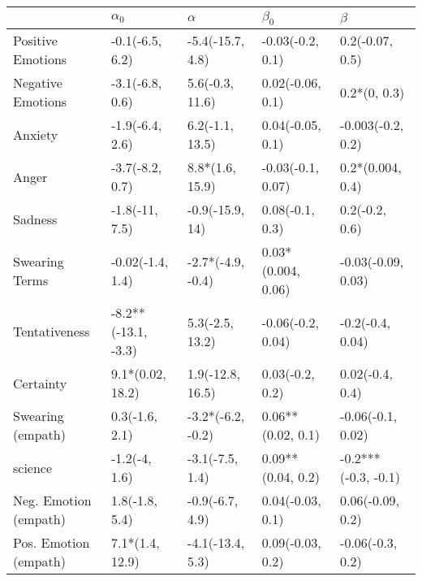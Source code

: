 \begin{tabular}{lllll}
\toprule
{} &           $\alpha_0$ &           $\alpha$ &           $\beta_0$ &              $\beta$ \\
\midrule
Positive Emotions     &      -0.1(-6.5, 6.2) &   -5.4(-15.7, 4.8) &    -0.03(-0.2, 0.1) &      0.2(-0.07, 0.5) \\
Negative Emotions     &      -3.1(-6.8, 0.6) &    5.6(-0.3, 11.6) &    0.02(-0.06, 0.1) &         0.2*(0, 0.3) \\
Anxiety               &      -1.9(-6.4, 2.6) &    6.2(-1.1, 13.5) &    0.04(-0.05, 0.1) &    -0.003(-0.2, 0.2) \\
Anger                 &      -3.7(-8.2, 0.7) &    8.8*(1.6, 15.9) &   -0.03(-0.1, 0.07) &     0.2*(0.004, 0.4) \\
Sadness               &       -1.8(-11, 7.5) &    -0.9(-15.9, 14) &     0.08(-0.1, 0.3) &       0.2(-0.2, 0.6) \\
Swearing Terms        &     -0.02(-1.4, 1.4) &  -2.7*(-4.9, -0.4) &  0.03*(0.004, 0.06) &   -0.03(-0.09, 0.03) \\
Tentativeness         &  -8.2**(-13.1, -3.3) &    5.3(-2.5, 13.2) &   -0.06(-0.2, 0.04) &     -0.2(-0.4, 0.04) \\
Certainty             &     9.1*(0.02, 18.2) &   1.9(-12.8, 16.5) &     0.03(-0.2, 0.2) &      0.02(-0.4, 0.4) \\
Swearing (empath)     &       0.3(-1.6, 2.1) &  -3.2*(-6.2, -0.2) &   0.06**(0.02, 0.1) &    -0.06(-0.1, 0.02) \\
science               &        -1.2(-4, 1.6) &    -3.1(-7.5, 1.4) &   0.09**(0.04, 0.2) &  -0.2***(-0.3, -0.1) \\
Neg. Emotion (empath) &       1.8(-1.8, 5.4) &    -0.9(-6.7, 4.9) &    0.04(-0.03, 0.1) &     0.06(-0.09, 0.2) \\
Pos. Emotion (empath) &      7.1*(1.4, 12.9) &   -4.1(-13.4, 5.3) &    0.09(-0.03, 0.2) &     -0.06(-0.3, 0.2) \\
\bottomrule
\end{tabular}
